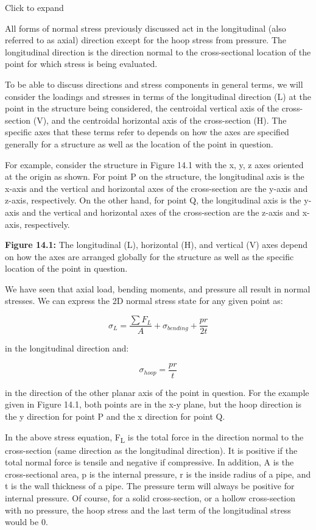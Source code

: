 \documentclass[
  letterpaper,
  DIV=11,
  numbers=noendperiod]{scrreprt}
\theoremstyle{definition}
\theoremstyle{remark}
\begin{document}
Click to expand

All forms of normal stress previously discussed act in the longitudinal
(also referred to as axial) direction except for the hoop stress from
pressure. The longitudinal direction is the direction normal to the
cross-sectional location of the point for which stress is being
evaluated.

To be able to discuss directions and stress components in general terms,
we will consider the loadings and stresses in terms of the longitudinal
direction (L) at the point in the structure being considered, the
centroidal vertical axis of the cross-section (V), and the centroidal
horizontal axis of the cross-section (H). The specific axes that these
terms refer to depends on how the axes are specified generally for a
structure as well as the location of the point in question.

For example, consider the structure in Figure 14.1 with the x, y, z axes
oriented at the origin as shown. For point P on the structure, the
longitudinal axis is the x-axis and the vertical and horizontal axes of
the cross-section are the y-axis and z-axis, respectively. On the other
hand, for point Q, the longitudinal axis is the y-axis and the vertical
and horizontal axes of the cross-section are the z-axis and x-axis,
respectively.

\textbf{Figure 14.1:} The longitudinal (L), horizontal (H), and vertical
(V) axes depend on how the axes are arranged globally for the structure
as well as the specific location of the point in question.

We have seen that axial load, bending moments, and pressure all result
in normal stresses. We can express the 2D normal stress state for any
given point as:

\[
\sigma_L=\frac{\sum F_L}{A}+\sigma_{bending}+\frac{p r}{2 t}
\]

in the longitudinal direction and:

\[
\sigma_{hoop}=\frac{p r}{t}
\]

in the direction of the other planar axis of the point in question. For
the example given in Figure 14.1, both points are in the x-y plane, but
the hoop direction is the y direction for point P and the x direction
for point Q.

In the above stress equation, F\textsubscript{L} is the total force in
the direction normal to the cross-section (same direction as the
longitudinal direction). It is positive if the total normal force is
tensile and negative if compressive. In addition, A is the
cross-sectional area, p is the internal pressure, r is the inside radius
of a pipe, and t is the wall thickness of a pipe. The pressure term will
always be positive for internal pressure. Of course, for a solid
cross-section, or a hollow cross-section with no pressure, the hoop
stress and the last term of the longitudinal stress would be 0.
\end{document}
